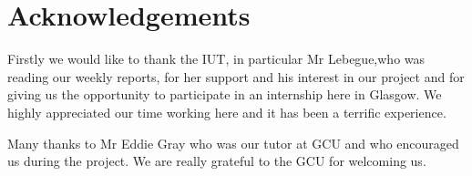 \chapter{Acknowledgements}

{\large


Firstly we would like to thank the IUT, in particular Mr Lebegue,who was reading our weekly reports, for her support and his interest in our project and for giving us the opportunity to participate in an internship here in Glasgow. We highly appreciated our time working here and it has been a terrific experience.\linebreak

Many thanks to Mr Eddie Gray who was our tutor at GCU and who encouraged us during the project. We are really grateful to the GCU for welcoming us.\linebreak

}


\newpage